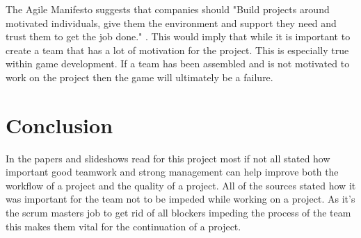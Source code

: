 \documentclass{scrartcl}
\begin{document}
The Agile Manifesto suggests that companies should "Build projects around motivated individuals, give them the environment and support they need and trust them to get the job done." \cite{fowler2001agile}. This would imply that while it is important to create a team that has a lot of motivation for the project. This is especially true within game development. If a team has been assembled and is not motivated to work on the project then the game will ultimately be a failure.

\section{Conclusion}

In the papers and slideshows read for this project most if not all stated how important good teamwork and strong management can help improve both the workflow of a project and the quality of a project. All of the sources stated how it was important for the team not to be impeded while working on a project. As it's the scrum masters job to get rid of all blockers impeding the process of the team this makes them vital for the continuation of a project.



\end{document}

